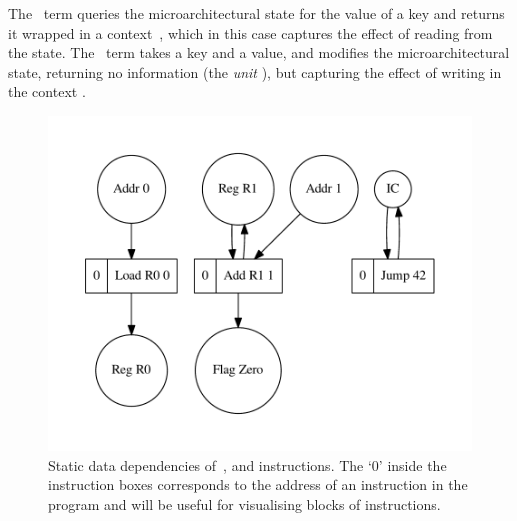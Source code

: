 The~ term queries the microarchitectural state for the value of a key
and returns it wrapped in a context~, which in this case captures the
effect of reading from the state. The~ term takes a key and a value,
and modifies the microarchitectural state, returning no information (the
\emph{unit} \hs{()}), but capturing the effect of writing in the context .


\begin{figure}
\vspace{-6mm}
\centerline{\includegraphics[scale=0.7]{img/loadJumpAdd.pdf}}
\vspace{-6mm}
\caption{Static data dependencies of~,  and
 instructions\protect\footnotemark. The `0' inside the instruction
boxes corresponds to the address of an instruction in the program and will be
useful for visualising blocks of instructions.\label{fig-example}}
\vspace{-6mm}
\end{figure}

